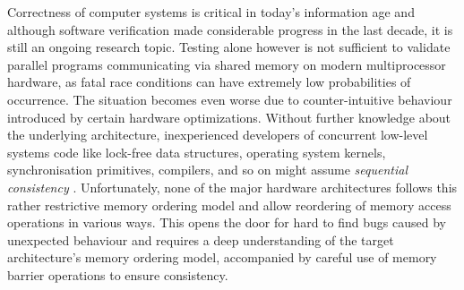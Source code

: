 Correctness of computer systems is critical in today's information age and although software verification made considerable progress in the last decade, it is still an ongoing research topic.
Testing alone however is not sufficient to validate parallel programs
communicating via shared memory on modern multiprocessor hardware,
as fatal race conditions can have extremely low probabilities of occurrence.
The situation becomes even worse due to counter-intuitive behaviour introduced by certain hardware optimizations.
Without further knowledge about the underlying architecture, inexperienced developers of
concurrent
low-level
systems code like lock-free data structures, operating system kernels, synchronisation
primitives,
compilers,
and so on
might assume
\emph{sequential consistency} \cite{ref:Lamport79}.
Unfortunately, none of the major hardware architectures follows this rather restrictive memory ordering model and allow
reordering of memory access operations
in various ways.
This opens the door for hard to find bugs caused by unexpected
behaviour
and
requires a deep understanding of the target architecture's memory ordering model,
accompanied by careful use of memory barrier operations to ensure consistency.



